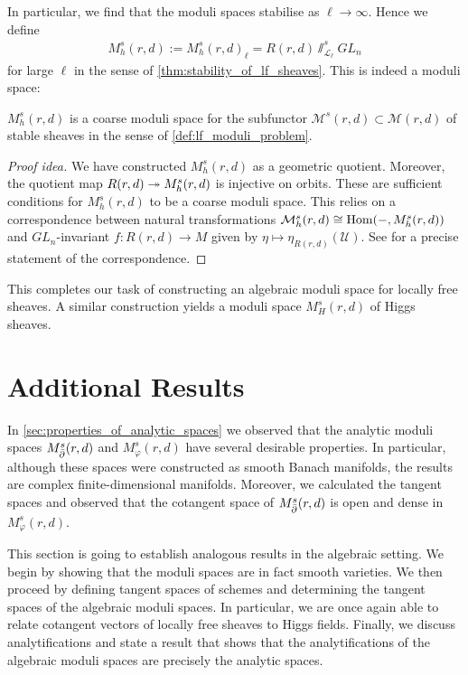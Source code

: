 \documentclass[12pt]{ociamthesis}  %
\begin{document}
In particular, we find that the moduli spaces stabilise as $\ell \to \infty$.
Hence we define
\begin{align}\label{eq:plain_algebraic_space}
  M^s_h(r,d) := M^s_h(r,d)_\ell = R(r,d)\sslash^s_{\mathscr L_\ell} GL_n
\end{align}
for large $\ell$ in the sense of \ref{thm:stability_of_lf_sheaves}.
This is indeed a moduli space:

\begin{corollary}
  $M^s_h(r,d)$ is a coarse moduli space for the subfunctor
  $\mathcal M^s(r,d)\subset\mathcal M(r,d)$ of stable sheaves in
  the sense of \ref{def:lf_moduli_problem}.
  \begin{proof}[Proof idea]
    We have constructed $M^s_h(r,d)$ as a geometric quotient. Moreover,
    the quotient map $R(r,d)\twoheadrightarrow M^s_h(r,d)$ is injective on
    orbits. These are sufficient conditions for $M^s_h(r,d)$
    to be a coarse moduli space. This relies on a correspondence between
    natural transformations $\mathcal M^s_h(r,d)\cong\operatorname{Hom}(-,M^s_h(r,d))$ and
    $GL_n$-invariant $f:R(r,d)\to M$ given by
    $\eta\mapsto\eta_{R(r,d)}(\mathscr U)$. See
    \cite[Proposition 3.35]{hoskins2016} for a precise statement
    of the correspondence.
  \end{proof}
\end{corollary}

This completes our task of constructing an algebraic moduli space
for locally free sheaves. A similar construction yields a moduli
space $M^s_H(r,d)$ of Higgs sheaves.

\section{Additional Results}

In \ref{sec:properties_of_analytic_spaces} we observed that the
analytic moduli spaces $M^s_{\bar{\partial}}(r,d)$ and $M^s_\varphi(r,d)$ have
several desirable properties. In particular, although
these spaces were constructed as smooth Banach manifolds, the results
are complex finite-dimensional manifolds. Moreover, we calculated
the tangent spaces and observed that the cotangent space of
$M^s_{\bar{\partial}}(r,d)$ is open and dense in $M^s_\varphi(r,d)$.

This section is going to establish analogous results in the algebraic
setting. We begin by showing that the moduli spaces are in fact
smooth varieties. We then proceed by defining tangent spaces of schemes
and determining the tangent spaces of the algebraic moduli spaces.
In particular, we are once again able to relate cotangent vectors
of locally free sheaves to Higgs fields. Finally, we discuss
analytifications and state a result that shows that the analytifications
of the algebraic moduli spaces are precisely the analytic spaces.
\end{document}
